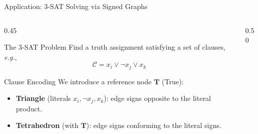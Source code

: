 \documentclass[A4,svgnames,9pt,aspectratio=169]{beamer}
\begin{document}
\begin{frame}{Application: 3-SAT Solving via Signed Graphs}
  \begin{columns}
    \begin{column}{0.45\textwidth}
      \begin{block}{The 3-SAT Problem}
        Find a truth assignment satisfying a set of clauses, \emph{e.g.},
        $$\mathcal{C} = x_i \lor \neg x_j \lor x_k$$
      \end{block}

      \begin{block}{Clause Encoding}
        We introduce a reference node $\mathbf{T}$ (\textsf{True}):
        \begin{itemize}
          \item \textbf{Triangle} (literals $x_i, \neg x_j, x_k$): edge signs opposite to the literal product.
          \item \textbf{Tetrahedron} (with $\mathbf{T}$): edge signs conforming to the literal signs.
        \end{itemize}
      \end{block}
    \end{column}
    
    \begin{column}{0.50\textwidth}
      \begin{center}
\end{center}
\end{column}
\end{columns}
\end{frame}
\end{document}
